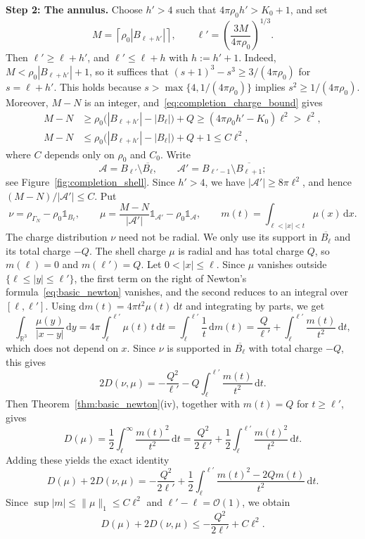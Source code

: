 \documentclass[final,reqno]{amsart}
\theoremstyle{remark}
\theoremstyle{definition}
\renewcommand{\le}{\leqslant}
\renewcommand{\ge}{\geqslant}
\newcommand{\RR}{\mathbb{R}}
\newcommand{\iden}{\mathbb{1}}
\begin{document}
\noindent\textbf{Step 2: The annulus.}
Choose $h'>4$ such that $4\pi\rho_0h'>K_0+1$, and set
\[
M=\left\lceil\rho_0|B_{\ell+h'}|\right\rceil,
\qquad
\ell'=\left(\frac{3M}{4\pi\rho_0}\right)^{1/3}.
\]
Then $\ell'\ge\ell+h'$, and $\ell'\le\ell+h$ with $h:=h'+1$. Indeed, $M<\rho_0|B_{\ell+h'}|+1$, so it suffices that $(s+1)^3-s^3\ge3/(4\pi\rho_0)$ for $s=\ell+h'$. This holds because $s>\max\{4,1/(4\pi\rho_0)\}$ implies $s^2\ge1/(4\pi\rho_0)$. Moreover, $M-N$ is an integer, and~\eqref{eq:completion_charge_bound} gives
\begin{align*}
M-N&\ge\rho_0\big(|B_{\ell+h'}|-|B_\ell|\big)+Q\ge(4\pi\rho_0h'-K_0)\ell^2>\ell^2,\\
M-N&\le\rho_0\big(|B_{\ell+h'}|-|B_\ell|\big)+Q+1\le C\ell^2,
\end{align*}
where $C$ depends only on $\rho_0$ and $C_0$. Write
\[
\mathcal A=B_{\ell'}\setminus\overline{B_\ell},\qquad
\mathcal A'=B_{\ell'-1}\setminus\overline{B_{\ell+1}};
\]
see Figure~\ref{fig:completion_shell}. Since $h'>4$, we have $|\mathcal A'|\ge8\pi\ell^2$, and hence $(M-N)/|\mathcal A'|\le C$. Put
\[
\nu=\rho_{\Gamma_N}-\rho_0\iden_{B_\ell},\qquad
\mu=\frac{M-N}{|\mathcal A'|}\iden_{\mathcal A'}-\rho_0\iden_{\mathcal A},\qquad
m(t)=\int_{\ell<|x|<t}\mu(x)\,\mathrm dx.
\]
The charge distribution $\nu$ need not be radial. We only use its support in $\overline{B_\ell}$ and its total charge $-Q$. The shell charge $\mu$ is radial and has total charge $Q$, so $m(\ell)=0$ and $m(\ell')=Q$. Let $0<|x|\le\ell$. Since $\mu$ vanishes outside $\{\ell\le|y|\le\ell'\}$, the first term on the right of Newton's formula~\eqref{eq:basic_newton} vanishes, and the second reduces to an integral over $[\ell,\ell']$. Using $\mathrm dm(t)=4\pi t^2\mu(t)\,\mathrm dt$ and integrating by parts, we get
\[
\int_{\RR^3}\frac{\mu(y)}{|x-y|}\,\mathrm dy
=4\pi\int_\ell^{\ell'}\mu(t)\,t\,\mathrm dt
=\int_\ell^{\ell'}\frac{1}{t}\,\mathrm dm(t)
=\frac Q{\ell'}+\int_\ell^{\ell'}\frac{m(t)}{t^2}\,\mathrm dt,
\]
which does not depend on $x$. Since $\nu$ is supported in $\overline{B_\ell}$ with total charge $-Q$, this gives
\[
2D(\nu,\mu)=-\frac{Q^2}{\ell'}-Q\int_\ell^{\ell'}\frac{m(t)}{t^2}\,\mathrm dt.
\]
Then Theorem~\ref{thm:basic_newton}(iv), together with $m(t)=Q$ for $t\ge \ell'$, gives
\[
D(\mu)=\frac12\int_\ell^\infty\frac{m(t)^2}{t^2}\,\mathrm dt
=\frac{Q^2}{2\ell'}+\frac12\int_\ell^{\ell'}\frac{m(t)^2}{t^2}\,\mathrm dt.
\]
Adding these yields the exact identity
\begin{equation}\label{eq:completion_shell_identity}
D(\mu)+2D(\nu,\mu)
=-\frac{Q^2}{2\ell'}
+\frac12\int_\ell^{\ell'}\frac{m(t)^2-2Qm(t)}{t^2}\,\mathrm dt.
\end{equation}
Since $\sup|m|\le\|\mu\|_1\le C\ell^2$ and $\ell'-\ell=\mathcal O(1)$, we obtain
\begin{equation}\label{eq:completion_shell_bound}
D(\mu)+2D(\nu,\mu)\le-\frac{Q^2}{2\ell'}+C\ell^2.
\end{equation}
\end{document}
